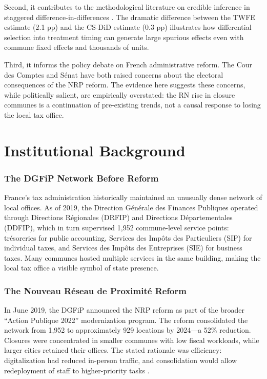 \documentclass[12pt]{article}
\begin{document}
Second, it contributes to the methodological literature on credible inference in staggered difference-in-differences \citep{callaway2021difference,sun2021estimating,dechaisemartin2020two,borusyak2024revisiting}. The dramatic difference between the TWFE estimate (2.1 pp) and the CS-DiD estimate (0.3 pp) illustrates how differential selection into treatment timing can generate large spurious effects even with commune fixed effects and thousands of units.

Third, it informs the policy debate on French administrative reform. The Cour des Comptes \citeyearpar{courdescomptes2022} and S\'{e}nat \citeyearpar{senat2020} have both raised concerns about the electoral consequences of the NRP reform. The evidence here suggests these concerns, while politically salient, are empirically overstated: the RN rise in closure communes is a continuation of pre-existing trends, not a causal response to losing the local tax office.

\section{Institutional Background}

\subsubsection*{The DGFiP Network Before Reform} France's tax administration historically maintained an unusually dense network of local offices. As of 2019, the Direction G\'{e}n\'{e}rale des Finances Publiques operated through Directions R\'{e}gionales (DRFIP) and Directions D\'{e}partementales (DDFIP), which in turn supervised 1,952 commune-level service points: tr\'{e}soreries for public accounting, Services des Imp\^{o}ts des Particuliers (SIP) for individual taxes, and Services des Imp\^{o}ts des Entreprises (SIE) for business taxes. Many communes hosted multiple services in the same building, making the local tax office a visible symbol of state presence.

\subsubsection*{The Nouveau R\'{e}seau de Proximit\'{e} Reform} In June 2019, the DGFiP announced the NRP reform as part of the broader ``Action Publique 2022'' modernization program. The reform consolidated the network from 1,952 to approximately 929 locations by 2024---a 52\% reduction. Closures were concentrated in smaller communes with low fiscal workloads, while larger cities retained their offices. The stated rationale was efficiency: digitalization had reduced in-person traffic, and consolidation would allow redeployment of staff to higher-priority tasks \citep{dgfip2019}.
\end{document}
